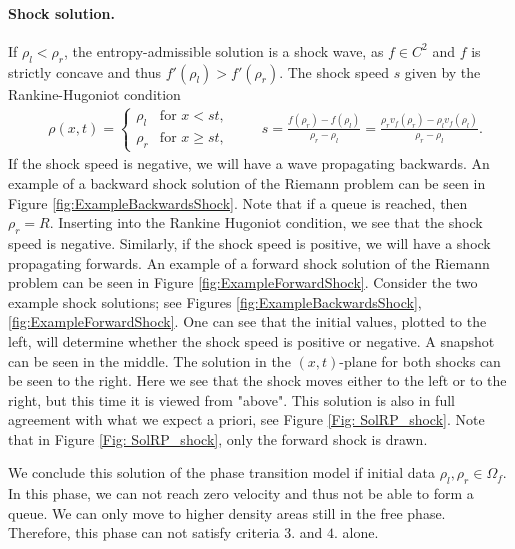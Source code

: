 \documentclass[10pt]{article}
\numberwithin{equation}{section}
\begin{document}
\paragraph{Shock solution.} If $\rho_l < \rho_r$, the entropy-admissible solution is a shock wave, as $f \in C^2$ and $f$ is strictly concave and thus $f'(\rho_l) > f'(\rho_r) $. The shock speed $s$ given by the Rankine-Hugoniot condition
\begin{align*}
    & \rho(x,t) = \begin{cases}
    \rho_l & \text{for $x < st$, } \\
    \rho_r & \text{for $x \geq st$, }
    \end{cases} 
    \quad \quad s = \frac{f(\rho_r) - f(\rho_l)}{\rho_r - \rho_l} = \frac{\rho_r v_f(\rho_r) -\rho_l v_f(\rho_l)}{\rho_r - \rho_l}.
\end{align*}
If the shock speed is negative, we will have a wave propagating backwards. An example of a backward shock solution of the Riemann problem can be seen in Figure \ref{fig:ExampleBackwardsShock}. Note that if a queue is reached, then $\rho_r = R$. Inserting into the Rankine Hugoniot condition, we see that the shock speed is negative. Similarly, if the shock speed is positive, we will have a shock propagating forwards. An example of a forward shock solution of the Riemann problem can be seen in Figure \ref{fig:ExampleForwardShock}.
Consider the two example shock solutions; see Figures \ref{fig:ExampleBackwardsShock}, \ref{fig:ExampleForwardShock}. One can see that the initial values, plotted to the left, will determine whether the shock speed is positive or negative. A snapshot can be seen in the middle. The solution in the $(x,t)$-plane for both shocks can be seen to the right. Here we see that the shock moves either to the left or to the right, but this time it is viewed from "above". This solution is also in full agreement with what we expect a priori, see Figure \ref{Fig: SolRP_shock}. Note that in Figure \ref{Fig: SolRP_shock}, only the forward shock is drawn. 

We conclude this solution of the phase transition model if initial data $\rho_l, \rho_r \in \Omega_f$. In this phase, we can not reach zero velocity and thus not be able to form a queue. We can only move to higher density areas still in the free phase. Therefore, this phase can not satisfy criteria $3.$ and $4.$ alone.  

\begin{figure} \centering
    
\end{figure}
\end{document}
